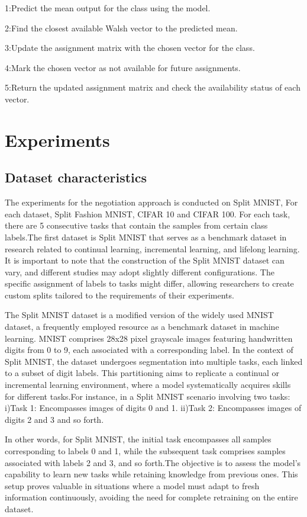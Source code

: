 \documentclass{article}
\begin{document}
1:Predict the mean output for the class using the model.


2:Find the closest available Walsh vector to the predicted mean.


3:Update the assignment matrix with the chosen vector for the class.


4:Mark the chosen vector as not available for future assignments.


5:Return the updated assignment matrix and check the availability status of each vector.

 

\section{Experiments}

\subsection{Dataset characteristics}

The experiments for the negotiation approach is conducted on  Split MNIST, For each dataset, Split Fashion MNIST, CIFAR 10 and CIFAR 100. For each task, there are 5 consecutive tasks that contain the samples from certain class labels.The first dataset is Split MNIST that serves as a benchmark dataset in research related to continual learning, incremental learning, and lifelong learning. It is important to note that the construction of the Split MNIST dataset can vary, and different studies may adopt slightly different configurations. The specific assignment of labels to tasks might differ, allowing researchers to create custom splits tailored to the requirements of their experiments.

The Split MNIST dataset is a modified version of the widely used MNIST dataset, a frequently employed resource as a benchmark dataset in machine learning. MNIST comprises 28x28 pixel grayscale images featuring handwritten digits from 0 to 9, each associated with a corresponding label.
In the context of Split MNIST, the dataset undergoes segmentation into multiple tasks, each linked to a subset of digit labels. This partitioning aims to replicate a continual or incremental learning environment, where a model systematically acquires skills for different tasks.For instance, in a Split MNIST scenario involving two tasks:
i)Task 1: Encompasses images of digits 0 and 1.
ii)Task 2: Encompasses images of digits 2 and 3 and so forth.

In other words, for Split MNIST, the initial task encompasses all samples corresponding to labels 0 and 1, while the subsequent task comprises samples associated with labels 2 and 3, and so forth.The objective is to assess the model's capability to learn new tasks while retaining knowledge from previous ones. This setup proves valuable in situations where a model must adapt to fresh information continuously, avoiding the need for complete retraining on the entire dataset.
\end{document}
